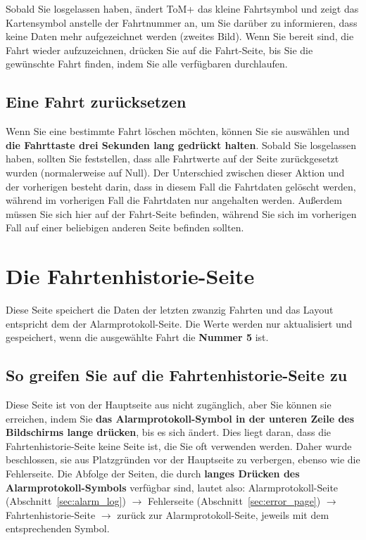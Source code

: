 Sobald Sie losgelassen haben, ändert ToM+ das kleine Fahrtsymbol und zeigt das Kartensymbol anstelle der Fahrtnummer an, um Sie darüber zu informieren, dass keine Daten mehr aufgezeichnet werden (zweites Bild). Wenn Sie bereit sind, die Fahrt wieder aufzuzeichnen, drücken Sie auf die Fahrt-Seite, bis Sie die gewünschte Fahrt finden, indem Sie alle verfügbaren durchlaufen.

\subsection{Eine Fahrt zurücksetzen}

Wenn Sie eine bestimmte Fahrt löschen möchten, können Sie sie auswählen und \textbf{die Fahrttaste drei Sekunden lang gedrückt halten}. Sobald Sie losgelassen haben, sollten Sie feststellen, dass alle Fahrtwerte auf der Seite zurückgesetzt wurden (normalerweise auf Null). Der Unterschied zwischen dieser Aktion und der vorherigen besteht darin, dass in diesem Fall die Fahrtdaten gelöscht werden, während im vorherigen Fall die Fahrtdaten nur angehalten werden.
Außerdem müssen Sie sich hier auf der Fahrt-Seite befinden, während Sie sich im vorherigen Fall auf einer beliebigen anderen Seite befinden sollten.

\clearpage

\section{Die Fahrtenhistorie-Seite}
\label{sec:trip_history}

Diese Seite speichert die Daten der letzten zwanzig Fahrten und das Layout entspricht dem der Alarmprotokoll-Seite.
Die Werte werden nur aktualisiert und gespeichert, wenn die ausgewählte Fahrt die \textbf{Nummer 5} ist.

\subsection{So greifen Sie auf die Fahrtenhistorie-Seite zu}

Diese Seite ist von der Hauptseite aus nicht zugänglich, aber Sie können sie erreichen, indem Sie \textbf{das Alarmprotokoll-Symbol in der unteren Zeile des Bildschirms lange drücken}, bis es sich ändert. Dies liegt daran, dass die Fahrtenhistorie-Seite keine Seite ist, die Sie oft verwenden werden. Daher wurde beschlossen, sie aus Platzgründen vor der Hauptseite zu verbergen, ebenso wie die Fehlerseite. Die Abfolge der Seiten, die durch \textbf{langes Drücken des Alarmprotokoll-Symbols} verfügbar sind, lautet also:
Alarmprotokoll-Seite (Abschnitt~\ref{sec:alarm_log}) $\rightarrow$ Fehlerseite (Abschnitt~\ref{sec:error_page}) $\rightarrow$ Fahrtenhistorie-Seite $\rightarrow$ zurück zur Alarmprotokoll-Seite,
jeweils mit dem entsprechenden Symbol.\\

